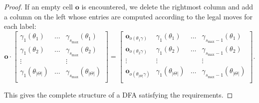 \documentclass[10pt,a4paper]{amsart}
\newcommand{\e}{\mathbf{o}}
\begin{document}
\begin{proof}
    If an empty cell $\e$ is encountered, we delete the rightmost column and add a column on the left whose entries are computed according to the legal moves for each label:
    \[
        \e\cdot
        \begin{bmatrix}
            \gamma_1(\theta_1) & \ldots & \gamma_{s_{\max}}(\theta_1) \\
            \gamma_1(\theta_2) & \ldots & \gamma_{s_{\max}}(\theta_2) \\
            \vdots & & \vdots \\
            \gamma_1(\theta_{|\varTheta|}) & \ldots & \gamma_{s_{\max}}(\theta_{|\varTheta|}) \\
        \end{bmatrix}
        =
        \begin{bmatrix}
            \e_{o(\theta_1 \gamma)} & \gamma_1(\theta_1) & \ldots & \gamma_{s_{\max}-1}(\theta_1) \\
            \e_{o(\theta_2 \gamma)} & \gamma_1(\theta_2) & \ldots & \gamma_{s_{\max}-1}(\theta_2) \\
            \vdots & \vdots & & \vdots \\
            \e_{o(\theta_{|\varTheta|} \gamma)} & \gamma_1(\theta_{|\varTheta|}) & \ldots & \gamma_{s_{\max}-1}(\theta_{|\varTheta|}) \\
        \end{bmatrix}.
    \]

    This gives the complete structure of a DFA satisfying the requirements.
\end{proof}
\end{document}
